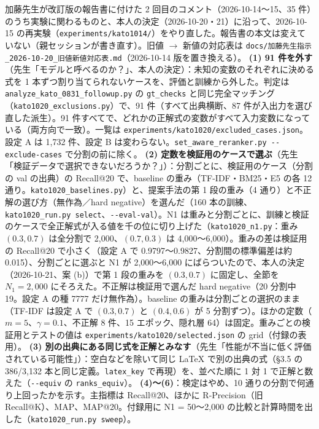 \documentclass[11pt,a4paper]{jsarticle}
\begin{document}
\begin{itemize}[nosep]
    加藤先生が改訂版の報告書に付けた 2 回目のコメント（2026-10-14〜15、35 件）のうち実験に関わるものと、本人の決定（2026-10-20・21）に沿って、2026-10-15 の再実験（\texttt{experiments/kato1014/}）をやり直した。報告書の本文は変えていない（親セッションが書き直す）。旧値 $\to$ 新値の対応表は \texttt{docs/加藤先生指示\_2026-10-20\_旧値新値対応表.md}（2026-10-14 版を置き換える）。
    \textbf{(1) 91 件を外す}（先生「モデルと呼べるのか？」、本人の決定）：未知の変数のそれぞれに決める式を 1 本ずつ割り当てられないケースを、評価と訓練から外した。判定は \texttt{analyze\_kato\_0831\_followup.py} の \texttt{gt\_checks} と同じ完全マッチング（\texttt{kato1020\_exclusions.py}）で、91 件（すべて出典横断、87 件が入出力を選び直した派生）。91 件すべてで、どれかの正解式の変数がすべて入力変数になっている（両方向で一致）。一覧は \texttt{experiments/kato1020/excluded\_cases.json}。設定 A は 1{,}732 件、設定 B は変わらない。\texttt{set\_aware\_reranker.py -{}-exclude-cases} で分割の前に除く。
    \textbf{(2) 定数を検証用のケースで選ぶ}（先生「検証データで選択できないだろうか？」）：分割ごとに、検証用のケース（分割の val の出典）の Recall@20 で、baseline の重み（TF-IDF・BM25・E5 の各 12 通り。\texttt{kato1020\_baselines.py}）と、提案手法の第 1 段の重み（4 通り）と不正解の選び方（無作為／hard negative）を選んだ（160 本の訓練、\texttt{kato1020\_run.py select}、\texttt{-{}-eval-val}）。N1 は重みと分割ごとに、訓練と検証のケースで全正解式が入る値を千の位に切り上げた（\texttt{kato1020\_n1.py}：重み $(0.3, 0.7)$ は全分割で 2{,}000、$(0.7, 0.3)$ は 4{,}000〜6{,}000）。重みの差は検証用の Recall@20 で小さく（設定 A で 0.9797〜0.9827、分割間の標準偏差は約 0.015）、分割ごとに選ぶと N1 が 2{,}000〜6{,}000 にばらついたので、本人の決定（2026-10-21、案 (b)）で第 1 段の重みを $(0.3, 0.7)$ に固定し、全節を $N_1 = 2{,}000$ にそろえた。不正解は検証用で選んだ hard negative（20 分割中 19。設定 A の種 7777 だけ無作為）。baseline の重みは分割ごとの選択のまま（TF-IDF は設定 A で $(0.3, 0.7)$ と $(0.4, 0.6)$ が 5 分割ずつ）。ほかの定数（$m = 5$、$\gamma = 0.1$、不正解 8 件、15 エポック、隠れ層 64）は固定。重みごとの検証用とテストの値は \texttt{experiments/kato1020/selected.json} の grid（付録の表用）。
    \textbf{(3) 別の出典にある同じ式を正解とみなす}（先生「性能が不当に低く評価されている可能性」）：空白などを除いて同じ LaTeX で別の出典の式（\S 3.5 の 386/3{,}132 本と同じ定義。\texttt{latex\_key} で再現）を、並べた順に 1 対 1 で正解と数えた（\texttt{-{}-equiv} の \texttt{ranks\_equiv}）。
    \textbf{(4)〜(6)}：検定はやめ、10 通りの分割で何通り上回ったかを示す。主指標は Recall@20、ほかに R-Precision（旧 Recall@K）、MAP、MAP@20。付録用に N1 = 50〜2{,}000 の比較と計算時間を出した（\texttt{kato1020\_run.py sweep}）。

\end{itemize}
\end{document}
